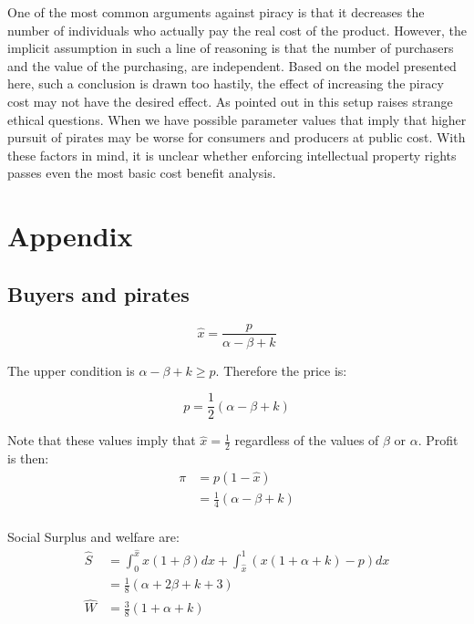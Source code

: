 One of the most common arguments against piracy is that it decreases the number of individuals who actually pay the real cost of the product.  However, the implicit assumption in such a line of reasoning is that the number of purchasers and the value of the purchasing, are independent. Based on the model presented here, such a conclusion is drawn too hastily, the effect of increasing the piracy cost may not have the desired effect. As pointed out in \cite{CRP91} this setup raises strange ethical questions. When we have possible parameter values that imply that higher pursuit of pirates may be worse for consumers and producers at public cost. With these factors in mind, it is unclear whether enforcing intellectual property rights passes even the most basic cost benefit analysis.

\newpage
\section{Appendix}
\subsection{Buyers and pirates}
\begin{equation*}
\hat{x} = \frac{p}{\alpha-\beta + k}
\end{equation*}

The upper condition is $\alpha-\beta+k \geq p$. Therefore the price is:

\begin{equation*}
p = \frac{1}{2}\left(
\alpha-\beta+k
\right)
\end{equation*}

Note that these values imply that $\hat{x} = \frac{1}{2}$ regardless of the values of $\beta$ or $\alpha$. Profit is then:
\begin{align*}
\pi &= p(1-\hat{x}) \\
&=  \frac{1}{4}\left(
\alpha-\beta+k
\right)  \\
\end{align*}

Social Surplus and welfare are:
\begin{align*}
\hat{S} &= \int_0^{\hat{x}}x(1+\beta)dx+
\int_{\hat{x}}^{1}\left( x(1+\alpha+k)-p \right)dx \\
&= \frac{1}{8} (\alpha+2 \beta+k+3) \\
\hat{W} &= \frac{3}{8} \left( 1 + \alpha +k
\right)
\end{align*}



